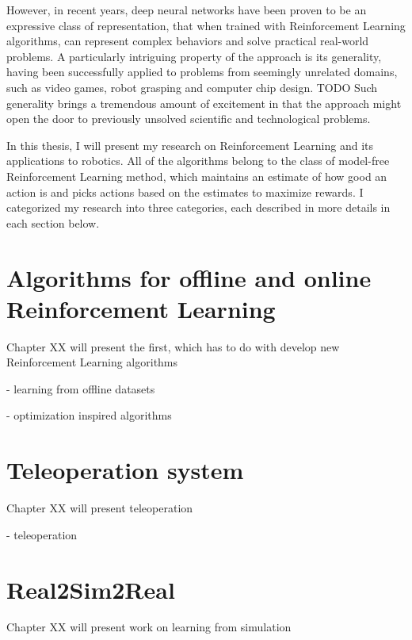 However, in recent years, deep neural networks have been proven 
to be an expressive class of representation, that when trained with Reinforcement
Learning algorithms, can represent complex behaviors and 
solve practical real-world problems. 
A particularly intriguing property of the approach is 
its generality, having been successfully applied 
to problems from seemingly unrelated domains,
such as video games, robot grasping and computer chip design. TODO
Such generality brings a tremendous amount of excitement 
in that the approach 
might open the door to previously unsolved scientific and 
technological problems.

In this thesis, I will present my research on Reinforcement Learning 
and its applications to robotics. 
All of the algorithms belong to the class of model-free 
Reinforcement Learning method, which maintains 
an estimate of how good an action is and picks 
actions based on the estimates to maximize rewards. 
I categorized my research into three categories, each described in more details
in each section below.

\section{Algorithms for offline and online Reinforcement Learning}

Chapter XX will present the first, which has to do with 
develop new Reinforcement Learning algorithms 

- learning from offline datasets 

- optimization inspired algorithms 

\section{Teleoperation system}

Chapter XX will present teleoperation 

- teleoperation 

\section{Real2Sim2Real}

Chapter XX will present work on learning 
from simulation